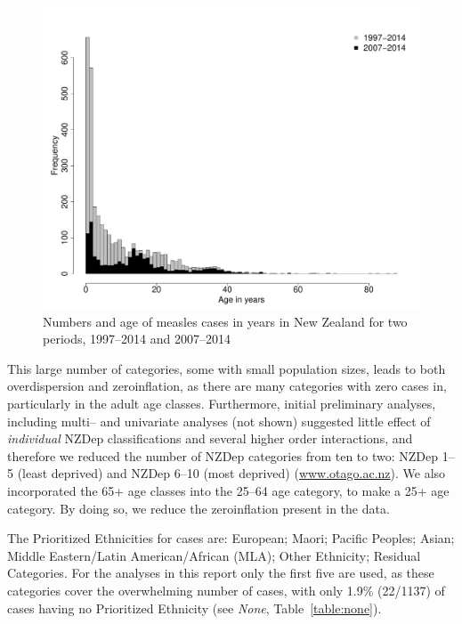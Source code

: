 \documentclass{article}
\begin{document}
\begin{figure}
\begin{center}
\includegraphics{draftfinalreport-002}
\end{center}
\caption{Numbers and age of measles cases in years in New Zealand for two periods, 1997--2014 and 2007--2014}
\label{fig:ageinyears}
\end{figure}





This large number of categories, some with small population sizes, leads to both overdispersion and zeroinflation, as there are many categories with zero cases in, particularly in the adult age classes. Furthermore, initial preliminary analyses, including multi-- and univariate analyses (not shown) suggested little effect of \textit{individual} NZDep classifications and several higher order interactions, and therefore we reduced the number of NZDep categories from ten to two: NZDep 1--5 (least deprived) and NZDep 6--10 (most deprived) (\href{http://www.otago.ac.nz/wellington/research/hirp/otago020194.html}{www.otago.ac.nz}). We also incorporated the 65+ age classes into the 25--64 age category, to make a 25+ age category. By doing so, we reduce the zeroinflation present in the data. 

The Prioritized Ethnicities for cases are:  European; Maori; Pacific Peoples; Asian; Middle Eastern/Latin American/African (MLA); Other Ethnicity; Residual Categories. For the analyses in this report only the first five are used, as these categories cover the overwhelming number of cases, with only 1.9\% (22/1137) of cases having no Prioritized Ethnicity (see \emph{None}, Table~\autoref{table:none}). 
\end{document}
